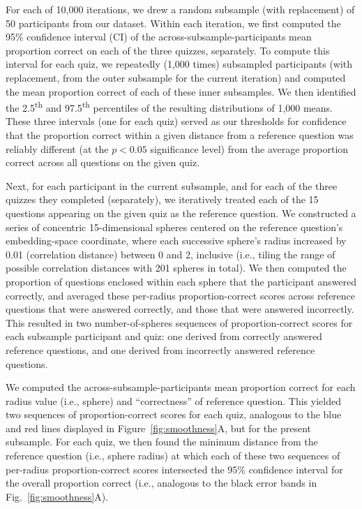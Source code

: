 \documentclass[10pt]{article}
\begin{document}
For each of 10,000 iterations, we drew a random subsample (with replacement) of
50 participants from our dataset. Within each iteration, we first computed the
95\% confidence interval (CI) of the across-subsample-participants mean
proportion correct on each of the three quizzes, separately. To compute this
interval for each quiz, we repeatedly (1,000 times) subsampled participants
(with replacement, from the outer subsample for the current iteration) and
computed the mean proportion correct of each of these inner subsamples. We then
identified the 2.5\textsuperscript{th} and 97.5\textsuperscript{th} percentiles
of the resulting distributions of 1,000 means. These three intervals (one for
each quiz) served as our thresholds for confidence that the proportion correct
within a given distance from a reference question was reliably different (at
the $p < 0.05$ significance level) from the average proportion correct across
all questions on the given quiz.

Next, for each participant in the current subsample, and for each of the three
quizzes they completed (separately), we iteratively treated each of the 15
questions appearing on the given quiz as the reference question. We
constructed a series of concentric 15-dimensional spheres centered on the
reference question's embedding-space coordinate, where each successive sphere's
radius increased by 0.01 (correlation distance) between 0 and 2, inclusive
(i.e., tiling the range of possible correlation distances with 201 spheres in
total). We then computed the proportion of questions enclosed within each
sphere that the participant answered correctly, and averaged these per-radius
proportion-correct scores across reference questions that were answered
correctly, and those that were answered incorrectly. This resulted in two
number-of-spheres sequences of proportion-correct scores for each subsample
participant and quiz: one derived from correctly answered reference questions,
and one derived from incorrectly answered reference questions.

We computed the across-subsample-participants mean proportion correct for each
radius value (i.e., sphere) and ``correctness'' of reference question. This
yielded two sequences of proportion-correct scores for each quiz, analogous to
the blue and red lines displayed in Figure~\ref{fig:smoothness}A, but for the
present subsample. For each quiz, we then found the minimum distance from the
reference question (i.e., sphere radius) at which each of these two sequences
of per-radius proportion-correct scores intersected the 95\% confidence
interval for the overall proportion correct (i.e., analogous to the black error
bands in Fig.~\ref{fig:smoothness}A).
\end{document}
